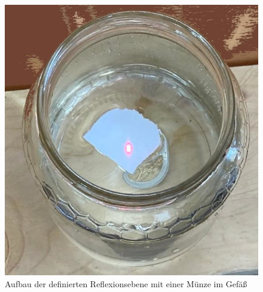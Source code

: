\documentclass[11pt,ngerman]{scrartcl}
\begin{document}
\begin{figure}[H]
\begin{minipage}[htbp]{\linewidth}
\begin{minipage}[htbp]{.54\linewidth}
            \includegraphics[width=\linewidth]{pics/aufbau2.jpeg}
        \caption[Aufbau der Reflexionsebene]{Aufbau der definierten Reflexionsebene 
        mit einer Münze im Gefäß}
        \label{fig:munze}
        \end{minipage}
    \end{minipage}
 \end{figure}
\end{document}

